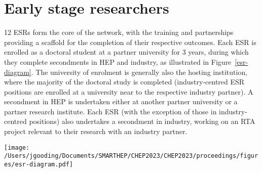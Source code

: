 \section{Early stage researchers}
\label{esrs}
12 ESRs form the core of the network, with the training and partnerships providing a scaffold for the completion of their respective outcomes. Each ESR is enrolled as a doctoral student at a partner university for 3 years, during which they complete secondments in HEP and industry, as illustrated in Figure~\ref{esr-diagram}. The university of enrolment is generally also the hosting institution, where the majority of the doctoral study is completed (industry-centred ESR positions are enrolled at a university near to the respective industry partner). A secondment in HEP is undertaken either at another partner university or a partner research institute. Each ESR (with the exception of those in industry-centred positions) also undertakes a secondment in industry, working on an RTA project relevant to their research with an industry partner.

\begin{figure*}[h!]
    \centering
    \texttt{[image: /Users/jgooding/Documents/SMARTHEP/CHEP2023/CHEP2023/proceedings/figures/esr-diagram.pdf]}
    \caption{Structure of a SMARTHEP ESR position. Each ESR is enrolled (i.), during which they will undertake secondments with network partners in HEP (ii.) and industry (iii.). Through the combination of primary and secondment work, each ESR will complete goals in HEP (iv.) and industry (v.), discussed in further detail in Section~\ref{goals}. Precise durations of the secondments vary between ESR positions.}
    \label{esr-diagram}
\end{figure*}

